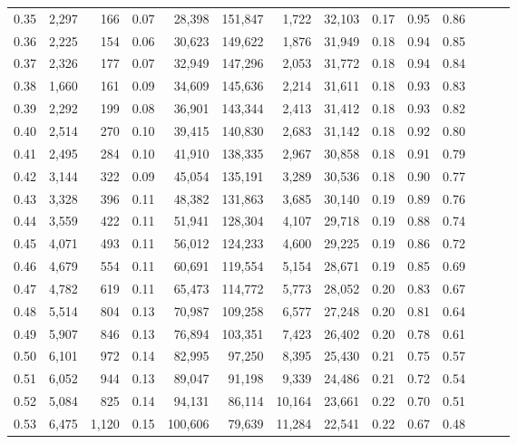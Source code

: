 \begin{tabular}{rrrrrrrrrrrrrr}
0.35 &  2,297 &    166 &  0.07 &   28,398 &  151,847 &   1,722 &  32,103 &  0.17 &  0.95 &      0.86 \\
0.36 &  2,225 &    154 &  0.06 &   30,623 &  149,622 &   1,876 &  31,949 &  0.18 &  0.94 &      0.85 \\
0.37 &  2,326 &    177 &  0.07 &   32,949 &  147,296 &   2,053 &  31,772 &  0.18 &  0.94 &      0.84 \\
0.38 &  1,660 &    161 &  0.09 &   34,609 &  145,636 &   2,214 &  31,611 &  0.18 &  0.93 &      0.83 \\
0.39 &  2,292 &    199 &  0.08 &   36,901 &  143,344 &   2,413 &  31,412 &  0.18 &  0.93 &      0.82 \\
0.40 &  2,514 &    270 &  0.10 &   39,415 &  140,830 &   2,683 &  31,142 &  0.18 &  0.92 &      0.80 \\
0.41 &  2,495 &    284 &  0.10 &   41,910 &  138,335 &   2,967 &  30,858 &  0.18 &  0.91 &      0.79 \\
0.42 &  3,144 &    322 &  0.09 &   45,054 &  135,191 &   3,289 &  30,536 &  0.18 &  0.90 &      0.77 \\
0.43 &  3,328 &    396 &  0.11 &   48,382 &  131,863 &   3,685 &  30,140 &  0.19 &  0.89 &      0.76 \\
0.44 &  3,559 &    422 &  0.11 &   51,941 &  128,304 &   4,107 &  29,718 &  0.19 &  0.88 &      0.74 \\
0.45 &  4,071 &    493 &  0.11 &   56,012 &  124,233 &   4,600 &  29,225 &  0.19 &  0.86 &      0.72 \\
0.46 &  4,679 &    554 &  0.11 &   60,691 &  119,554 &   5,154 &  28,671 &  0.19 &  0.85 &      0.69 \\
0.47 &  4,782 &    619 &  0.11 &   65,473 &  114,772 &   5,773 &  28,052 &  0.20 &  0.83 &      0.67 \\
0.48 &  5,514 &    804 &  0.13 &   70,987 &  109,258 &   6,577 &  27,248 &  0.20 &  0.81 &      0.64 \\
0.49 &  5,907 &    846 &  0.13 &   76,894 &  103,351 &   7,423 &  26,402 &  0.20 &  0.78 &      0.61 \\
0.50 &  6,101 &    972 &  0.14 &   82,995 &   97,250 &   8,395 &  25,430 &  0.21 &  0.75 &      0.57 \\
0.51 &  6,052 &    944 &  0.13 &   89,047 &   91,198 &   9,339 &  24,486 &  0.21 &  0.72 &      0.54 \\
0.52 &  5,084 &    825 &  0.14 &   94,131 &   86,114 &  10,164 &  23,661 &  0.22 &  0.70 &      0.51 \\
0.53 &  6,475 &  1,120 &  0.15 &  100,606 &   79,639 &  11,284 &  22,541 &  0.22 &  0.67 &      0.48 \\

\end{tabular}
